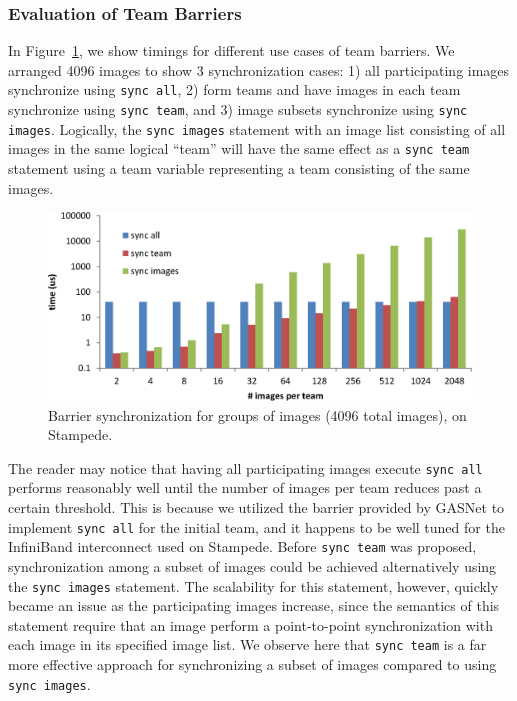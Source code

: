 \subsubsection{Evaluation of Team Barriers}
In Figure~\ref{fig:stampede-team-barrier}, we show timings for different use
cases of team barriers. We arranged 4096 images to show 3 synchronization cases: 1)
all participating images synchronize using \texttt{sync all}, 2) form
teams and have images in each team synchronize using \texttt{sync team}, and
3) image subsets synchronize using \texttt{sync images}.  Logically, the
\texttt{sync images} statement with an image list consisting of all images in
the same logical ``team'' will have the same effect as
a \texttt{sync team} statement using a team variable representing a team
consisting of the same images.

\begin{figure}[h]
  \centering
  \includegraphics[width=\columnwidth]{figures/stampede-team-barrier-4096.eps}
  \caption{Barrier synchronization for groups of images (4096 total images), on Stampede.}
  \label{fig:stampede-team-barrier}
\end{figure}

The reader may notice that having all participating images execute
\texttt{sync all} performs reasonably well until the number of images per team
reduces past a certain threshold. This is because we utilized the barrier
provided by GASNet to implement \texttt{sync all} for the initial team, and it
happens to be well tuned for the InfiniBand interconnect used on Stampede.
Before \texttt{sync~team} was proposed, synchronization among a subset of
images could be achieved alternatively using the \texttt{sync~images}
statement.  The scalability for this statement, however, quickly became an
issue as the participating images increase, since the semantics of this
statement require that an image perform a point-to-point synchronization with
each image in its specified image list.  We observe here that \texttt{sync team} is
a far more effective approach for synchronizing a subset of images compared to
using \texttt{sync images}.

